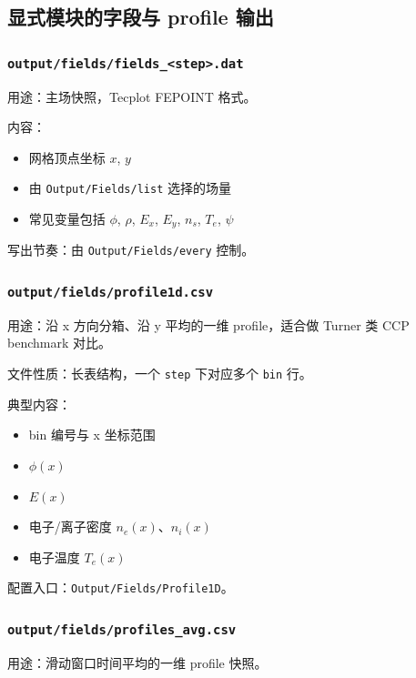 \documentclass[11pt,a4paper]{ctexart}
\newcommand{\code}[1]{\texttt{#1}}
\newcommand{\file}[1]{\texttt{#1}}
\newcommand{\sym}[1]{\ensuremath{#1}}
\begin{document}
\subsection{显式模块的字段与 profile 输出}

\subsubsection{\file{output/fields/fields\_<step>.dat}}

用途：主场快照，Tecplot FEPOINT 格式。

内容：

\begin{itemize}
  \item 网格顶点坐标 \sym{x}, \sym{y}
  \item 由 \code{Output/Fields/list} 选择的场量
  \item 常见变量包括 \sym{\phi}, \sym{\rho}, \sym{E_x}, \sym{E_y}, \sym{n_s}, \sym{T_e}, \sym{\psi}
\end{itemize}

写出节奏：由 \code{Output/Fields/every} 控制。

\subsubsection{\file{output/fields/profile1d.csv}}

用途：沿 x 方向分箱、沿 y 平均的一维 profile，适合做 Turner 类 CCP benchmark 对比。

文件性质：长表结构，一个 \code{step} 下对应多个 \code{bin} 行。

典型内容：

\begin{itemize}
  \item bin 编号与 x 坐标范围
  \item \sym{\phi(x)}
  \item \sym{E(x)}
  \item 电子/离子密度 \sym{n_e(x)}、\sym{n_i(x)}
  \item 电子温度 \sym{T_e(x)}
\end{itemize}

配置入口：\code{Output/Fields/Profile1D}。

\subsubsection{\file{output/fields/profiles\_avg.csv}}

用途：滑动窗口时间平均的一维 profile 快照。
\end{document}
